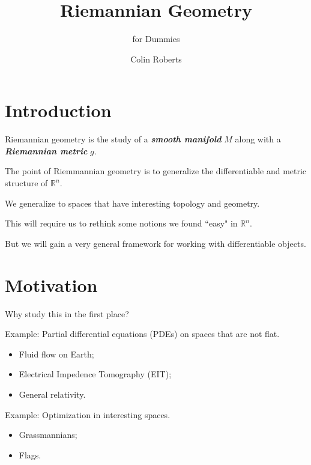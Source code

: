 \documentclass[UKenglish]{beamer}
\author{Colin Roberts}
\title{Riemannian Geometry}
\subtitle{for Dummies}
\newcommand\boldgreen[1]{\textcolor{lighter_csu_green}{\emph{\textbf{#1}}}}
\newcommand{\R}{\mathbb{R}}
\begin{document}
\section{Introduction}

\begin{frame}{}
	\vfill
	\large{Riemannian geometry} is the study of a \boldgreen{smooth manifold} $M$ along with a \boldgreen{Riemannian metric} $g$. 
	\vfill
\end{frame}

\begin{frame}{}
	\vfill
	The point of Riemmannian geometry is to generalize the differentiable and metric structure of $\R^n$.
	\vfill
\end{frame}

\begin{frame}{}
	\vfill
	We generalize to spaces that have interesting topology and geometry.
	\vfill
\end{frame}

\begin{frame}{}
	\vfill
	This will require us to rethink some notions we found ``easy" in $\R^n$.
	\vfill
\end{frame}

\begin{frame}{}
	\vfill
	But we will gain a very general framework for working with differentiable objects.
	\vfill
\end{frame}

\section{Motivation}

\begin{frame}{}
	\vfill
	Why study this in the first place?
	\vfill
\end{frame}

\begin{frame}{}
	\vfill
	Example: Partial differential equations (PDEs) on spaces that are not flat.
	\pause
	\begin{itemize}
		\item Fluid flow on Earth;
		\pause
		\item Electrical Impedence Tomography (EIT);
		\pause
		\item General relativity.
	\end{itemize}
	\vfill
\end{frame}

\begin{frame}{}
	\vfill
	Example: Optimization in interesting spaces.
	\pause
	\begin{itemize}
		\item Grassmannians;
		\pause
		\item Flags.
	\end{itemize}
	\vfill
\end{frame}
\end{document}

